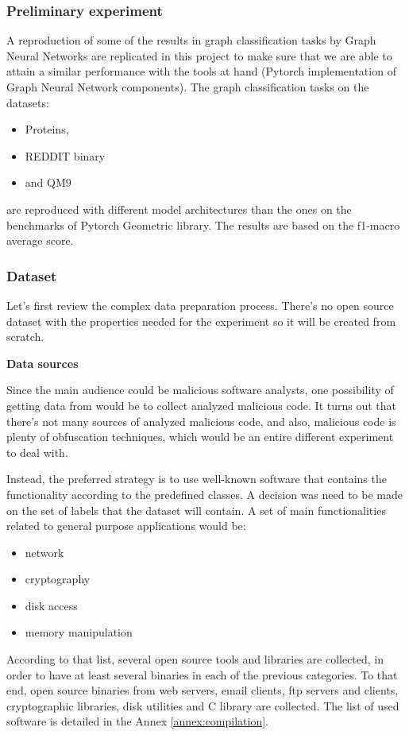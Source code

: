 \subsubsection{Preliminary experiment}

A reproduction of some of the results in graph classification tasks by Graph Neural Networks are replicated in this project to make sure that we are able to attain a similar performance with the tools at hand (Pytorch implementation of Graph Neural Network components). The graph classification tasks on the datasets:
\begin{itemize} 	
	\item Proteins, 
	\item REDDIT binary
	\item and QM9 
\end{itemize} 

are reproduced with different model architectures than the ones on the benchmarks of Pytorch Geometric library. The results are based on the f1-macro average score.




\subsubsection{Dataset}

Let's first review the complex data preparation process. There's no open source dataset with the properties needed for the experiment so it will be created from scratch.



\textbf{Data sources}

Since the main audience could be malicious software analysts, one possibility of getting data from would be to collect analyzed malicious code. It turns out that there's not many sources of analyzed malicious code, and also, malicious code is plenty of obfuscation techniques, which would be an entire different experiment to deal with. 

Instead, the preferred strategy is to use well-known software that contains the functionality according to the predefined classes. A decision was need to be made on the set of labels that the dataset will contain. A set of main functionalities related to general purpose applications would be:
\begin{itemize}
	\item network
	\item cryptography
	\item disk access
	\item memory manipulation
\end{itemize}
According to that list, several open source tools and libraries are collected, in order to have at least several binaries in each of the previous categories. To that end, open source binaries from web servers, email clients, ftp servers and clients, cryptographic libraries, disk utilities and C library are collected. The list of used software is detailed in the Annex \ref{annex:compilation}.

